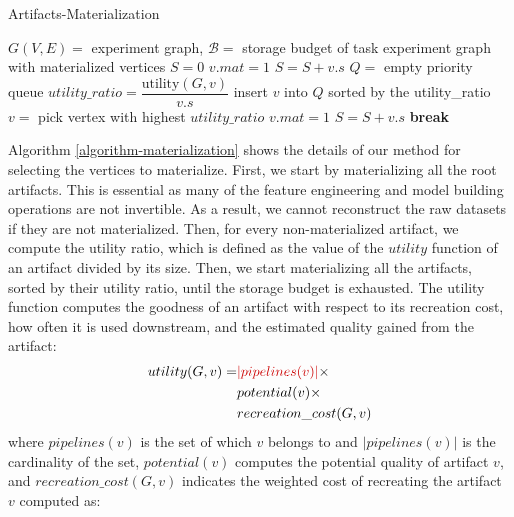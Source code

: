 \begin{algorithm}[h]
\caption{Artifacts-Materialization}\label{algorithm-materialization}
\begin{algorithmic}[1]
\Require  $G(V,E)=$ experiment graph, $\mathcal{B}=$ storage budget of task
\Ensure experiment graph with materialized vertices
\State $S= 0$ 
 
		\State $v.mat = 1$
		\State $S = S + v.s$
	\EndIf
\EndFor
\State $Q = $ empty priority queue
		\State $utility\_ratio = \dfrac{\text{utility}(G, v)}{v.s}$
		\State insert $v$ into $Q$ sorted by the utility\_ratio
	\EndIf
\EndFor
{}
\State $v =$ pick vertex with highest $utility\_ratio$ 
\State $v.mat = 1$
\State $S = S + v.s$
\Else
\State \textbf{break} 		
\EndIf
\EndWhile
\end{algorithmic}
\end{algorithm}
Algorithm \ref{algorithm-materialization} shows the details of our method for selecting the vertices to materialize.
First, we start by materializing all the root artifacts.
This is essential as many of the feature engineering and model building operations are not invertible.
As a result, we cannot reconstruct the raw datasets if they are not materialized.
Then, for every non-materialized artifact, we compute the utility ratio, which is defined as the value of the $utility$ function of an artifact divided by its size.
Then, we start materializing all the artifacts, sorted by their utility ratio, until the storage budget is exhausted.
The utility function computes the goodness of an artifact with respect to its recreation cost, how often it is used downstream, and the estimated quality gained from the artifact:
\begin{equation}
\begin{split}
utility(G,v) = 	& \hldel{|pipelines(v)|} \times \\
								&	potential(v) \times \\
								& recreation\_cost(G,v)  
 \end{split}
\end{equation}
where $pipelines(v)$ is the set of  which $v$ belongs to and $|pipelines(v)|$ is the cardinality of the set, $potential(v)$ computes the potential quality of artifact $v$, and $recreation\_cost(G,v)$ indicates the weighted cost of recreating the artifact $v$ computed as:
